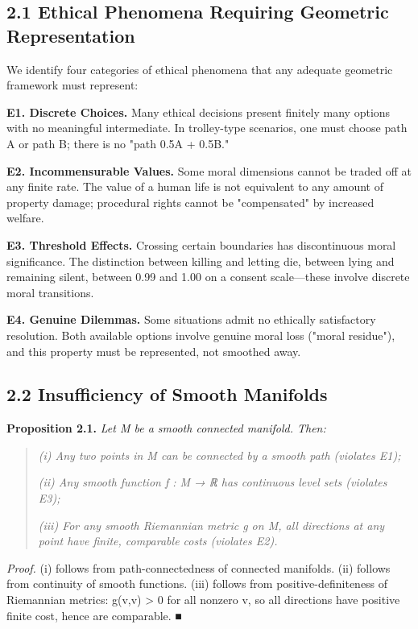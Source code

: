 \documentclass[12pt]{article}
\theoremstyle{plain}
\theoremstyle{definition}
\theoremstyle{remark}
\begin{document}
\subsection{2.1 Ethical Phenomena Requiring Geometric
Representation}\label{ethical-phenomena-requiring-geometric-representation}

We identify four categories of ethical phenomena that any adequate
geometric framework must represent:

\textbf{E1. Discrete Choices.} Many ethical decisions present finitely
many options with no meaningful intermediate. In trolley-type scenarios,
one must choose path A or path B; there is no "path 0.5A + 0.5B."

\textbf{E2. Incommensurable Values.} Some moral dimensions cannot be
traded off at any finite rate. The value of a human life is not
equivalent to any amount of property damage; procedural rights cannot be
"compensated" by increased welfare.

\textbf{E3. Threshold Effects.} Crossing certain boundaries has
discontinuous moral significance. The distinction between killing and
letting die, between lying and remaining silent, between 0.99 and 1.00
on a consent scale---these involve discrete moral transitions.

\textbf{E4. Genuine Dilemmas.} Some situations admit no ethically
satisfactory resolution. Both available options involve genuine moral
loss ("moral residue"), and this property must be represented, not
smoothed away.

\subsection{2.2 Insufficiency of Smooth
Manifolds}\label{insufficiency-of-smooth-manifolds}

\textbf{Proposition 2.1.} \emph{Let M be a smooth connected manifold.
Then:}

\begin{quote}
\emph{(i) Any two points in M can be connected by a smooth path
(violates E1);}

\emph{(ii) Any smooth function f : M → ℝ has continuous level sets
(violates E3);}

\emph{(iii) For any smooth Riemannian metric g on M, all directions at
any point have finite, comparable costs (violates E2).}
\end{quote}

\emph{Proof.} (i) follows from path-connectedness of connected
manifolds. (ii) follows from continuity of smooth functions. (iii)
follows from positive-definiteness of Riemannian metrics: g(v,v)
\textgreater{} 0 for all nonzero v, so all directions have positive
finite cost, hence are comparable. ■
\end{document}
